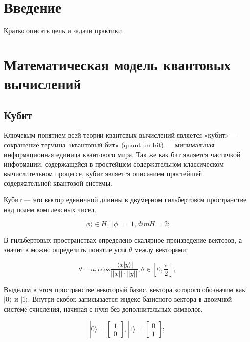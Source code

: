 \documentclass[14pt]{article}
\newcommand{\anonsection}[1]{\section*{#1}\addcontentsline{toc}{section}{#1}}
\begin{document}
	\tableofcontents 
	
	\newpage
	\anonsection{Введение}
	Кратко описать цель и задачи практики.

	
	\newpage
	\section{Математическая модель квантовых вычислений}
	\subsection{Кубит}
	
	Ключевым понятием всей теории квантовых вычислений является «кубит» — сокращение термина «квантовый бит» (quantum bit) — минимальная информационная единица квантового мира. Так же как бит является частичкой информации, содержащейся в простейшем содержательном классическом вычислительном процессе, кубит является описанием простейшей содержательной квантовой системы.
	
Кубит — это вектор единичной длинны в двумерном гильбертовом пространстве над полем комплексных чисел.
	
	\begin{equation}
	|\phi \rangle \in H, ||\phi|| = 1, dimH = 2;	
	\end{equation}
	
	В гильбертовых пространствах определено скалярное произведение векторов, а значит в можно определить понятие угла $\theta$ между векторами:

	\begin{equation}
	\theta = arccos \frac{ | \langle x|y \rangle | }{||x|| \cdot ||y||}, \theta \in [0, \frac{\pi}{2}];
	\end{equation}

	Выделим в этом пространстве некоторый базис, вектора которого обозначим как $|0 \rangle$ и $|1 \rangle$. Внутри скобок записывается индекс базисного вектора в двоичной системе счисления, начиная с нуля без дополнительных символов.

	\begin{equation}
	|0 \rangle = \begin{bmatrix} 1 \\ 0 \end{bmatrix}, 
	|1 \rangle = \begin{bmatrix} 0 \\ 1 \end{bmatrix};
	\end{equation}
\end{document}
